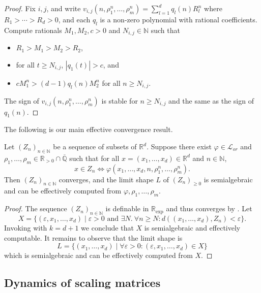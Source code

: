 \documentclass[a4paper,UKenglish,cleveref]{lipics-v2021}
\newcommand{\nat}{\mathbb{N}}
\newcommand{\rel}{\mathbb{R}}
\newcommand{\rat}{\mathbb{Q}}
\newcommand{\alg}{\overline{\rat}}
\newcommand{\rexp}{\rel_{\exp}}
\newcommand{\Lcal}{\mathcal{L}}
\newcommand{\seq}[1]{(#1)_{n \in \mathbb{N}}}
\begin{document}
\begin{proof}
	Fix $i,j$, and write $v_{i,j}(n,\rho_1^n,\ldots,\rho_m^n) = \sum_{l=1}^d q_l(n)R_l^n$ where  $R_1 > \cdots > R_d > 0$, and each $q_l$ is a non-zero polynomial with rational coefficients.
	Compute rationals $M_1, M_2, c > 0$ and $N_{i,j} \in \nat$ such that 
	\begin{itemize}
		\item $R_1 > M_1 > M_2 > R_2$,
		\item  for all $t \ge N_{i,j}$, $|q_1(t)| > c$, and 
		\item $c M_1^n > (d-1)q_l(n)M_2^n$ for all $n \ge N_{i,j}$.
	\end{itemize}
	The sign of $v_{i,j}(n,\rho_1^n,\ldots,\rho_m^n)$ is stable for $n \ge N_{i,j}$ and the same as the sign of $q_1(n)$.
\end{proof}

The following is our main effective convergence result.

\begin{lemma}
	\label{thm:omin-effective-2}
	Let $(Z_n)_{n \in \nat}$ be a sequence of subsets of $\rel^d$.
	Suppose there exist $\varphi \in \Lcal_{or}$ and $\rho_1,\ldots,\rho_m \in \rel_{>0} \cap \alg$ such that for all $x = (x_1,\ldots,x_d) \in \rel^d$ and $n \in \nat$,
	\begin{equation}
		\label{eq:thm:scaling-matrices-lim-shape-1}
		x \in Z_n \Leftrightarrow \varphi(x_1,\ldots,x_d, n, \rho_1^n,\ldots,\rho_m^n).
	\end{equation}
	Then $\seq{Z_n}$ converges, and the limit shape $L$ of $(Z_n)_{\ge 0}$ is semialgebraic and can be effectively computed from $\varphi, \rho_1,\ldots,\rho_m$.
\end{lemma}
\begin{proof}
	The sequence $(Z_n)_{n\in\nat}$ is definable in $\rexp$ and thus converges by .
	Let 
	\[
	X = \{(\varepsilon, x_1,\ldots,x_d) \mid  \varepsilon > 0 \textrm{ and } \exists N.\: \forall n \ge N \colon d((x_1,\ldots,x_d), Z_n) < \varepsilon\}.
	\]
	Invoking  with $k = d + 1$ we conclude that $X$ is semialgebraic and effectively computable.
	It remains to observe that the limit shape is
	\[
	L = \{(x_1,\ldots,x_d) \mid \forall \varepsilon>0\colon  (\varepsilon, x_1,\ldots,x_d) \in X\}
	\]
	which is semialgebraic and can be effectively computed from $X$.
\end{proof}

\subsection{Dynamics of scaling matrices}
\label{sec:scaling-dynamics}
\end{document}
